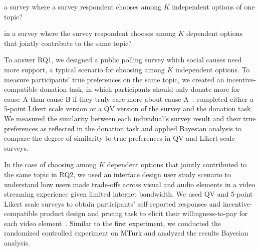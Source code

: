 \begin{itemize}
    {} a survey where a survey respondent chooses among $K$ independent options of one topic? 
    
    {}

    {} in a survey where the survey respondent chooses among $K$ dependent options that jointly contribute to the same topic? 
\end{itemize}

To answer RQ1, we designed a public polling survey{} which social causes need more support, a typical scenario for choosing among $K$ independent options. To measure participants' true preferences on the same topic, we created an incentive-compatible donation task, in which participants should only donate more for cause A than cause B if they truly care more about cause A~\cite{champ1997using}. {} completed either a 5-point Likert scale version or a QV version of the survey and the donation task {} We measured the similarity between each individual's survey result and their true preferences as reflected in the donation task and applied Bayesian analysis to compare the degree of similarity to true preferences in QV and Likert scale surveys.

In the case of choosing among $K$ dependent options that jointly contributed to the same topic in RQ2, we used an interface design user study scenario to understand how users made trade-offs across visual and audio elements in a video streaming experience given limited internet bandwidth. We used QV and 5-point Likert scale surveys to obtain participants' self-reported responses and {}incentive-compatible product design and pricing task to elicit their willingness-to-pay for each video element~\cite{roth1982incentive}. Similar to the first experiment, we conducted the randomized controlled experiment on MTurk and analyzed the results {} Bayesian analysis.


